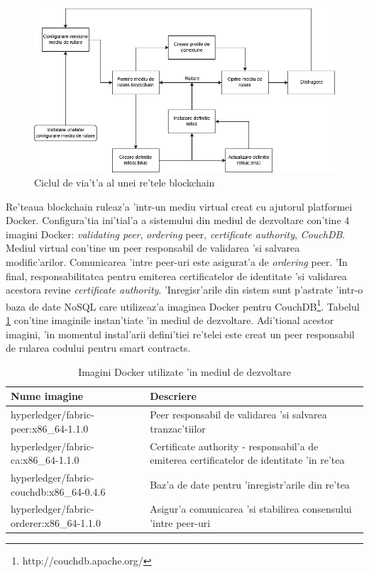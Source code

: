 \documentclass[12pt,a4paper,twoside]{report}
\begin{document}
        	\begin{figure}[H]
		\begin{center}
			\includegraphics[scale=0.55]{img/deploy.png}
			\caption{Ciclul de via't'a al unei re'tele blockchain}
  			\label{fig:par}
  		\end{center}
  		\end{figure}
  		
  	Re'teaua blockchain ruleaz'a 'intr-un mediu virtual creat cu
ajutorul platformei Docker. Configura'tia ini'tial'a a sistemului din mediul de dezvoltare con'tine 4 imagini Docker: \emph{validating peer}, \emph{ordering} peer, \emph{certificate authority}, \emph{CouchDB}. Mediul virtual con'tine un peer responsabil de validarea 'si salvarea modific'arilor. Comunicarea 'intre peer-uri este asigurat'a de \emph{ordering} peer. 'In final, responsabilitatea pentru emiterea certificatelor de identitate 'si validarea acestora revine \emph{certificate authority}. 'Inregisr'arile din sistem sunt p'astrate 'intr-o baza de date NoSQL care utilizeaz'a imaginea Docker pentru CouchDB\footnote{http://couchdb.apache.org/}. Tabelul \ref{table:img} con'tine imaginile instan'tiate 'in mediul de dezvoltare. Adi'tional acestor imagini, 'in momentul instal'arii defini'tiei re'telei este creat un peer responsabil de rularea codului pentru smart contracts.

\begin{table}[]
\centering
\label{table:img}
\caption{Imagini Docker utilizate 'in mediul de dezvoltare}
\begin{tabular}{|p{7.5cm}|p{6cm}|}
\hline
\hline
Nume imagine                          & Descriere                                               \\ \hline
hyperledger/fabric-peer:x86\_64-1.1.0 & Peer responsabil de validarea 'si salvarea tranzac'tiilor \\ \hline
hyperledger/fabric-ca:x86\_64-1.1.0 & Certificate authority - responsabil'a de emiterea certificatelor de identitate 'in re'tea \\ \hline   
hyperledger/fabric-couchdb:x86\_64-0.4.6 & Baz'a de date pentru 'inregistr'arile din re'tea\\ \hline
hyperledger/fabric-orderer:x86\_64-1.1.0 & Asigur'a comunicarea 'si stabilirea consensului 'intre peer-uri\\ \hline
\end{tabular}
\end{table}
\end{document}

